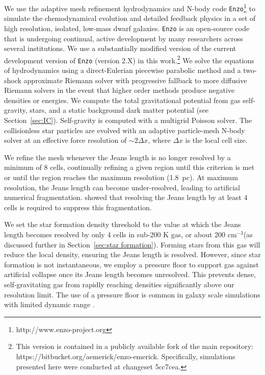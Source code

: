 \documentclass[twocolumn]{aastex61}
\newcommand{\ccunit}{cm$^{-3}$}
\begin{document}
We use the adaptive mesh refinement hydrodynamics and N-body code \texttt{Enzo}\footnote{http://www.enzo-project.org} to simulate the chemodynamical evolution and detailed feedback physics in a set of high resolution, isolated, low-mass dwarf galaxies. \texttt{Enzo} is an open-source code that is undergoing continual, active development by many researchers across several institutions. We use a substantially modified version of the current development version of \texttt{Enzo} (version 2.X) in this work.\footnote{This version is contained in a publicly available fork of the main repository: https://bitbucket.org/aemerick/enzo-emerick. Specifically, simulations presented here were conducted at changeset 5cc7cea.} We solve the equations of hydrodynamics using a direct-Eulerian piecewise parabolic method \citep{ColellaWoodward1984, Bryan1995} and a two-shock approximate Riemann solver with progressive fallback to more diffusive Riemann solvers in the event that higher order methods produce negative densities or energies. We compute the total gravitational potential from gas self-gravity, stars, and a static background dark matter potential (see Section~\ref{sec:IC}). Self-gravity is computed with a multigrid Poisson solver. The collisionless star particles are evolved with an adaptive particle-mesh N-body solver at an effective force resolution of $\sim 2 \Delta x$, where $\Delta x$ is the local cell size. 

We refine the mesh whenever the Jeans length is no longer resolved by a minimum of 8 cells, continually refining a given region until this criterion is met or until the region reaches the maximum resolution (1.8~pc). At maximum resolution, the Jeans length can become under-resolved, leading to artificial numerical fragmentation. \citet{Truelove1997} showed that resolving the Jeans length by at least 4 cells is required to suppress this fragmentation.

We set the star formation density threshold to the value at which the Jeans length becomes resolved by only 4 cells in sub-200 K gas, or about 200 \ccunit (as discussed further in Section~\ref{sec:star formation}). Forming stars from this gas will reduce the local density, ensuring the Jeans length is resolved. However, since star formation is not instantaneous, we employ a pressure floor to support gas against artificial collapse once its Jeans length becomes unresolved. This prevents dense, self-gravitating gas from rapidly reaching densities significantly above our resolution limit. The use of a pressure floor is common in galaxy scale simulations with limited dynamic range \citep[e.g][]{Machacek2001, 2008ApJ...680.1083R}.
\end{document}
